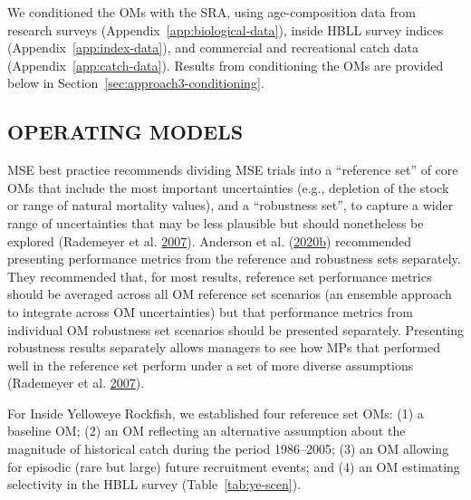 \documentclass[11pt]{book}
\begin{document}
We conditioned the OMs with the SRA, using age-composition data from research surveys (Appendix~\ref{app:biological-data}), inside HBLL survey indices (Appendix~\ref{app:index-data}), and commercial and recreational catch data (Appendix~\ref{app:catch-data}). Results from conditioning the OMs are provided below in Section~\ref{sec:approach3-conditioning}.

\hypertarget{sec:approach3-oms}{%
\subsection{OPERATING MODELS}\label{sec:approach3-oms}}

MSE best practice recommends dividing MSE trials into a ``reference set'' of core OMs that include the most important uncertainties (e.g., depletion of the stock or range of natural mortality values), and a ``robustness set'', to capture a wider range of uncertainties that may be less plausible but should nonetheless be explored (Rademeyer et al. \protect\hyperlink{ref-rademeyer2007}{2007}). Anderson et al. (\protect\hyperlink{ref-anderson2020gfmp}{2020}\protect\hyperlink{ref-anderson2020gfmp}{b}) recommended presenting performance metrics from the reference and robustness sets separately. They recommended that, for most results, reference set performance metrics should be averaged across all OM reference set scenarios (an ensemble approach to integrate across OM uncertainties) but that performance metrics from individual OM robustness set scenarios should be presented separately. Presenting robustness results separately allows managers to see how MPs that performed well in the reference set perform under a set of more diverse assumptions (Rademeyer et al. \protect\hyperlink{ref-rademeyer2007}{2007}).

For Inside Yelloweye Rockfish, we established four reference set OMs: (1) a baseline OM; (2) an OM reflecting an alternative assumption about the magnitude of historical catch during the period 1986--2005; (3) an OM allowing for episodic (rare but large) future recruitment events; and (4) an OM estimating selectivity in the HBLL survey (Table~\ref{tab:ye-scen}).
\end{document}
